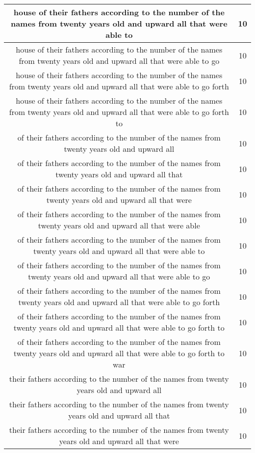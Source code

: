 \begin{center}
\begin{longtable}{|c|c|}
house of their fathers according to the number of the names from twenty years old and upward all that were able to & 10\\ \hline 
house of their fathers according to the number of the names from twenty years old and upward all that were able to go & 10\\ \hline 
house of their fathers according to the number of the names from twenty years old and upward all that were able to go forth & 10\\ \hline 
house of their fathers according to the number of the names from twenty years old and upward all that were able to go forth to & 10\\ \hline 
of their fathers according to the number of the names from twenty years old and upward all & 10\\ \hline 
of their fathers according to the number of the names from twenty years old and upward all that & 10\\ \hline 
of their fathers according to the number of the names from twenty years old and upward all that were & 10\\ \hline 
of their fathers according to the number of the names from twenty years old and upward all that were able & 10\\ \hline 
of their fathers according to the number of the names from twenty years old and upward all that were able to & 10\\ \hline 
of their fathers according to the number of the names from twenty years old and upward all that were able to go & 10\\ \hline 
of their fathers according to the number of the names from twenty years old and upward all that were able to go forth & 10\\ \hline 
of their fathers according to the number of the names from twenty years old and upward all that were able to go forth to & 10\\ \hline 
of their fathers according to the number of the names from twenty years old and upward all that were able to go forth to war & 10\\ \hline 
their fathers according to the number of the names from twenty years old and upward all & 10\\ \hline 
their fathers according to the number of the names from twenty years old and upward all that & 10\\ \hline 
their fathers according to the number of the names from twenty years old and upward all that were & 10\\ \hline 

\end{longtable}
\end{center}
